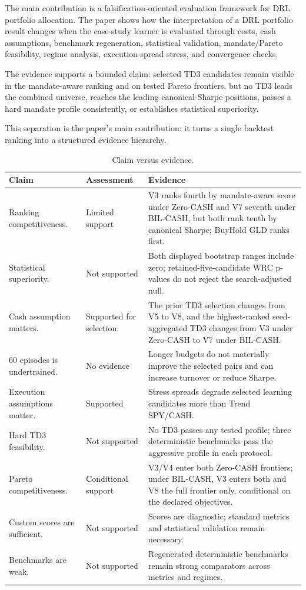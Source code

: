 \documentclass[11pt]{article}
\renewcommand{\arraystretch}{1.18}
\newcommand{\cashzero}{Zero-CASH}
\newcommand{\cashbil}{BIL-CASH}
\begin{document}
The main contribution is a falsification-oriented evaluation framework for DRL portfolio allocation. The paper shows how the interpretation of a DRL portfolio result changes when the case-study learner is evaluated through costs, cash assumptions, benchmark regeneration, statistical validation, mandate/Pareto feasibility, regime analysis, execution-spread stress, and convergence checks.

The evidence supports a bounded claim: selected TD3 candidates remain visible in the mandate-aware ranking and on tested Pareto frontiers, but no TD3 leads the combined universe, reaches the leading canonical-Sharpe positions, passes a hard mandate profile consistently, or establishes statistical superiority.

This separation is the paper's main contribution: it turns a single backtest ranking into a structured evidence hierarchy.

\begin{table}[htbp]
\centering
\caption{Claim versus evidence.}
\label{tab:claim-evidence}
\footnotesize
\setlength{\tabcolsep}{5pt}
\renewcommand{\arraystretch}{1.22}
\begin{tabularx}{\textwidth}{@{}L{0.25\textwidth} L{0.13\textwidth} Y@{}}
\toprule
Claim & Assessment & Evidence \\
\midrule
Ranking competitiveness. & Limited support & V3 ranks fourth by mandate-aware score under \cashzero{} and V7 seventh under \cashbil{}, but both rank tenth by canonical Sharpe; BuyHold GLD ranks first. \\
Statistical superiority. & Not supported & Both displayed bootstrap ranges include zero; retained-five-candidate WRC p-values do not reject the search-adjusted null. \\
Cash assumption matters. & Supported for selection & The prior TD3 selection changes from V5 to V8, and the highest-ranked seed-aggregated TD3 changes from V3 under \cashzero{} to V7 under \cashbil{}. \\
60 episodes is undertrained. & No evidence & Longer budgets do not materially improve the selected pairs and can increase turnover or reduce Sharpe. \\
Execution assumptions matter. & Supported & Stress spreads degrade selected learning candidates more than Trend SPY/CASH. \\
Hard TD3 feasibility. & Not supported & No TD3 passes any tested profile; three deterministic benchmarks pass the aggressive profile in each protocol. \\
Pareto competitiveness. & Conditional support & V3/V4 enter both \cashzero{} frontiers; under \cashbil{}, V3 enters both and V8 the full frontier only, conditional on the declared objectives. \\
Custom scores are sufficient. & Not supported & Scores are diagnostic; standard metrics and statistical validation remain necessary. \\
Benchmarks are weak. & Not supported & Regenerated deterministic benchmarks remain strong comparators across metrics and regimes. \\
\bottomrule
\end{tabularx}
\end{table}
\end{document}
